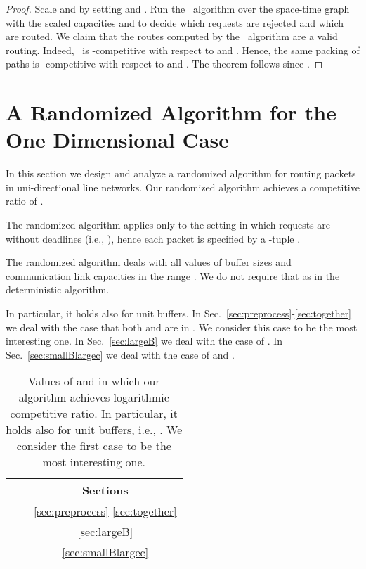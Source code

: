 \documentclass[11pt]{article}
\newcommand{\route}{\text{\sc{ipp}}}
\newcommand{\IPP}{\route}
\newenvironment{proof sketch}[1]{\noindent {\emph{Proof sketch of #1:}}}{\hfill \qed}
\begin{document}
\begin{proof}Scale  and  by setting  and .  Run the \IPP\ algorithm over the space-time graph
   with the scaled capacities  and  to decide which requests are
  rejected and which are routed. We claim that the routes computed by the \IPP\
  algorithm are a valid routing. Indeed, \IPP\ is -competitive with respect to
   and . Hence, the same packing of paths is -competitive
  with respect to  and .
  The theorem follows since .
\end{proof}


\section{A Randomized Algorithm for the One Dimensional Case}
\label{sec:randalg} In this section we design and analyze a
randomized algorithm for routing packets in uni-directional
line networks. Our randomized algorithm achieves a
competitive ratio of .

\begin{comment}
Recall that a unidirectional line network with  nodes is a directed path
. The vertices are denoted by .  The set of
directed edges is .
The parameters of the line network are:  nodes, buffer size  in
each node, and link capacity .  We assume that .

We assume that (i)~all edges have identical capacities, denoted by ,
(ii)~all nodes have the same buffer size, denoted by , and (iii)
\end{comment}
The randomized algorithm applies only to the setting in which requests are {without} deadlines (i.e., ),
hence each packet is specified by a -tuple .

The randomized algorithm deals with all values of buffer sizes and communication link
capacities in the range . We do not require that  as in the
deterministic algorithm.

In particular, it holds also for unit buffers.  In
Sec.~\ref{sec:preprocess}-\ref{sec:together} we deal with
the case that both  and  are in . We
consider this case to be the most interesting one. In
Sec.~\ref{sec:largeB} we deal with the case of .  In Sec.~\ref{sec:smallBlargec} we deal
with the case of  and .

\renewcommand{\arraystretch}{2}
\begin{table}[H]
\begin{centering}
\begin{tabular}{|c|c|c|}
\hline
 &  & Sections\tabularnewline
\hline
\hline
 &  & \ref{sec:preprocess}-\ref{sec:together} \tabularnewline
\hline
 &  & \ref{sec:largeB}\tabularnewline
\hline
 &  & \ref{sec:smallBlargec}\tabularnewline
\hline
\end{tabular}
\par\end{centering}
\caption{Values of  and  in which our algorithm achieves logarithmic competitive ratio. In particular, it holds also for unit buffers, i.e., . We consider the first case to be the most interesting one.}
\label{table:discussion}
\end{table}
\renewcommand{\arraystretch}{1}
\end{document}
